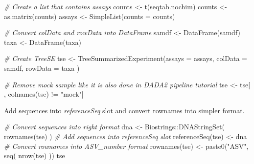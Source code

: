 \documentclass[
]{book}
\newenvironment{Shaded}{\begin{snugshade}}{\end{snugshade}}
\newcommand{\AttributeTok}[1]{\textcolor[rgb]{0.77,0.63,0.00}{#1}}
\newcommand{\CommentTok}[1]{\textcolor[rgb]{0.56,0.35,0.01}{\textit{#1}}}
\newcommand{\FunctionTok}[1]{\textcolor[rgb]{0.00,0.00,0.00}{#1}}
\newcommand{\NormalTok}[1]{#1}
\newcommand{\OtherTok}[1]{\textcolor[rgb]{0.56,0.35,0.01}{#1}}
\newcommand{\SpecialCharTok}[1]{\textcolor[rgb]{0.00,0.00,0.00}{#1}}
\newcommand{\StringTok}[1]{\textcolor[rgb]{0.31,0.60,0.02}{#1}}
\begin{document}
\begin{Shaded}
\begin{Highlighting}[]
\CommentTok{\# Create a list that contains assays}
\NormalTok{counts }\OtherTok{\textless{}{-}} \FunctionTok{t}\NormalTok{(seqtab.nochim)}
\NormalTok{counts }\OtherTok{\textless{}{-}} \FunctionTok{as.matrix}\NormalTok{(counts)}
\NormalTok{assays }\OtherTok{\textless{}{-}} \FunctionTok{SimpleList}\NormalTok{(}\AttributeTok{counts =}\NormalTok{ counts)}

\CommentTok{\# Convert colData and rowData into DataFrame}
\NormalTok{samdf }\OtherTok{\textless{}{-}} \FunctionTok{DataFrame}\NormalTok{(samdf)}
\NormalTok{taxa }\OtherTok{\textless{}{-}} \FunctionTok{DataFrame}\NormalTok{(taxa)}

\CommentTok{\# Create TreeSE}
\NormalTok{tse }\OtherTok{\textless{}{-}} \FunctionTok{TreeSummarizedExperiment}\NormalTok{(}\AttributeTok{assays =}\NormalTok{ assays,}
                                \AttributeTok{colData =}\NormalTok{ samdf,}
                                \AttributeTok{rowData =}\NormalTok{ taxa}
\NormalTok{                                )}

\CommentTok{\# Remove mock sample like it is also done in DADA2 pipeline tutorial}
\NormalTok{tse }\OtherTok{\textless{}{-}}\NormalTok{ tse[ , }\FunctionTok{colnames}\NormalTok{(tse) }\SpecialCharTok{!=} \StringTok{"mock"}\NormalTok{]}
\end{Highlighting}
\end{Shaded}

Add sequences into \emph{referenceSeq} slot and convert rownames into simpler format.

\begin{Shaded}
\begin{Highlighting}[]
\CommentTok{\# Convert sequences into right format}
\NormalTok{dna }\OtherTok{\textless{}{-}}\NormalTok{ Biostrings}\SpecialCharTok{::}\FunctionTok{DNAStringSet}\NormalTok{( }\FunctionTok{rownames}\NormalTok{(tse) )}
\CommentTok{\# Add sequences into referenceSeq slot}
\FunctionTok{referenceSeq}\NormalTok{(tse) }\OtherTok{\textless{}{-}}\NormalTok{ dna}
\CommentTok{\# Convert rownames into ASV\_number format}
\FunctionTok{rownames}\NormalTok{(tse) }\OtherTok{\textless{}{-}} \FunctionTok{paste0}\NormalTok{(}\StringTok{"ASV"}\NormalTok{, }\FunctionTok{seq}\NormalTok{( }\FunctionTok{nrow}\NormalTok{(tse) ))}
\NormalTok{tse}
\end{Highlighting}
\end{Shaded}
\end{document}
